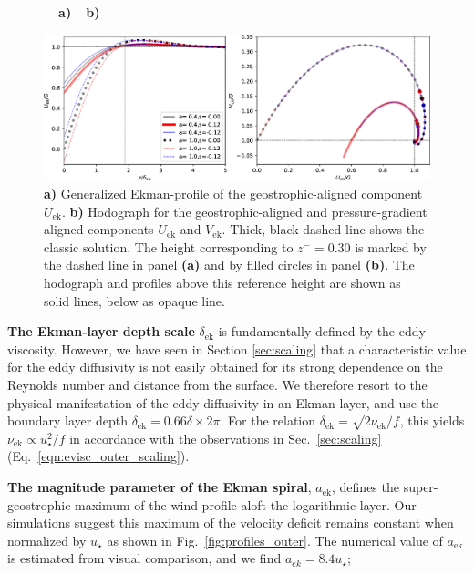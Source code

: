 \documentclass[smallcondensed,final]{svjour3}
\begin{document}
\begin{figure}
  \begin{flushleft}
    \textbf{\ \ a)}\hspace{0.45\textwidth}\textbf{\ \ b)}\\
  \end{flushleft} 
  \includegraphics[width=\textwidth]{Fig5.eps} %
  \caption{\label{fig:ekman_ideal}
    \textbf{a)} Generalized Ekman-profile of the geostrophic-aligned component $U_\mathrm{ek}$.
    \textbf{b)} Hodograph for the geostrophic-aligned and pressure-gradient aligned components $U_\mathrm{ek}$ and $V_\mathrm{ek}$.
    Thick, black dashed line shows the classic solution. The height corresponding to $z^-=0.30$ is marked by the dashed line in panel \textbf{(a)}
    and by filled circles in panel \textbf{(b)}. The hodograph and profiles above this reference height are
    shown as solid lines, below as opaque line.
  } 
\end{figure} 
%
\textbf{The Ekman-layer depth scale} $\delta_\mathrm{ek}$ is fundamentally defined by the eddy viscosity.
%
However, we have seen in Section \ref{sec:scaling} that a characteristic value for the eddy diffusivity
is not easily obtained for its strong dependence on the Reynolds number and distance from the surface.
%
We therefore resort to the physical manifestation of the eddy diffusivity in an Ekman layer, and use the
boundary layer depth $\delta_\mathrm{ek} = 0.66 \delta \times 2\pi$.
%
For the relation $\delta_\mathrm{ek}=\sqrt{2\nu_\mathrm{ek}/f}$, this yields
$\nu_\mathrm{ek} \propto u_\star^2/f$ in accordance with the observations in
Sec.~\ref{sec:scaling} (Eq.~\ref{eqn:evisc_outer_scaling}). 
%
\par
%
\textbf{The magnitude parameter of the Ekman spiral}, $a_\mathrm{ek}$, defines the super-geostrophic maximum of the
wind profile aloft the logarithmic layer. Our simulations suggest this maximum of the velocity deficit
remains constant when normalized by $u_\star$ as shown in Fig.~\ref{fig:profiles_outer}.
%
The numerical value of $a_\mathrm{ek}$ is estimated from visual comparison, and we find $a_{ek}=8.4u_\star$;
\end{document}
